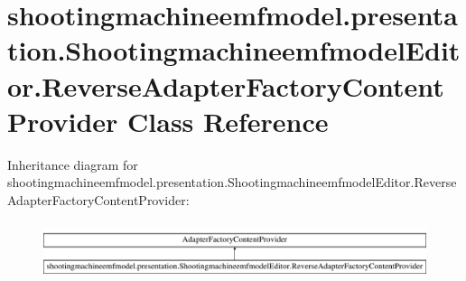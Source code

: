 \hypertarget{classshootingmachineemfmodel_1_1presentation_1_1_shootingmachineemfmodel_editor_1_1_reverse_adapter_factory_content_provider}{\section{shootingmachineemfmodel.\-presentation.\-Shootingmachineemfmodel\-Editor.\-Reverse\-Adapter\-Factory\-Content\-Provider Class Reference}
\label{classshootingmachineemfmodel_1_1presentation_1_1_shootingmachineemfmodel_editor_1_1_reverse_adapter_factory_content_provider}
}
Inheritance diagram for shootingmachineemfmodel.\-presentation.\-Shootingmachineemfmodel\-Editor.\-Reverse\-Adapter\-Factory\-Content\-Provider\-:\begin{figure}[H]
\begin{center}
\leavevmode
\includegraphics[height=1.702128cm]{classshootingmachineemfmodel_1_1presentation_1_1_shootingmachineemfmodel_editor_1_1_reverse_adapter_factory_content_provider}
\end{center}
\end{figure}
